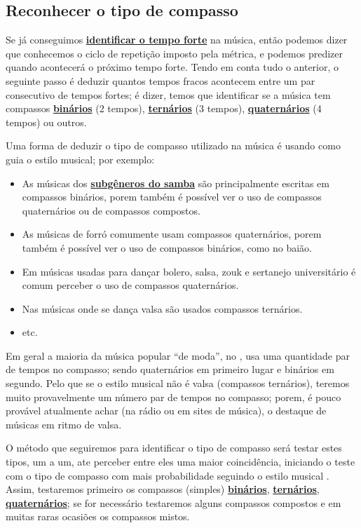 \subsection{Reconhecer o tipo de compasso}
\label{subsec:pertipodecompasso}
Se já conseguimos \hyperref[subsec:perceberTF1]{\textbf{identificar o tempo forte}} na música,
então podemos dizer que conhecemos o ciclo de repetição imposto pela métrica,
e podemos predizer quando acontecerá o próximo tempo forte.
Tendo em conta tudo o anterior,
o seguinte passo é deduzir quantos tempos fracos acontecem 
entre um par consecutivo de tempos fortes;
é dizer, 
temos que identificar se a música tem compassos 
\hyperref[subsec:compassobinario]{\textbf{binários}} (2 tempos), 
\hyperref[subsec:compassoternario]{\textbf{ternários}} (3 tempos), 
\hyperref[subsec:compassoquaternario]{\textbf{quaternários}} (4 tempos) 
ou outros. 

Uma forma de deduzir o tipo de compasso utilizado na música  é usando como guia o estilo musical; por exemplo:
\begin{itemize}
\item As músicas dos \hyperref[sec:FamiliaSamba]{\textbf{subgêneros do samba}} 
são principalmente escritas em compassos binários,
porem também é possível ver o uso de compassos quaternários ou de compassos compostos.
\item As músicas de forró comumente usam compassos quaternários,
porem também é possível ver o uso de compassos binários, como no baião. 
\item Em músicas usadas para dançar bolero, salsa, zouk 
e sertanejo universitário é comum perceber o uso de compassos quaternários.
\item Nas músicas onde se dança valsa são usados compassos ternários.
\item etc.
\end{itemize}
Em geral a maioria da música popular ``de moda'', no \AnoLivro, usa uma quantidade par de tempos no compasso;
sendo quaternários em primeiro lugar e binários em segundo.
Pelo que se o estilo musical não é valsa (compassos ternários), 
teremos muito provavelmente um número par de tempos no compasso;
porem, é  pouco provável atualmente achar (na rádio ou em sites de música),
o destaque de músicas em ritmo de valsa.

O método que seguiremos para identificar o tipo de compasso será testar estes tipos,
um a um, ate perceber entre eles uma maior coincidência,
iniciando o teste com o tipo de compasso com mais probabilidade seguindo o estilo musical \cite[pp. 10]{wright1992social}.
Assim, testaremos primeiro os compassos (simples)
\hyperref[subsec:compassobinario]{\textbf{binários}}, 
\hyperref[subsec:compassoternario]{\textbf{ternários}}, 
\hyperref[subsec:compassoquaternario]{\textbf{quaternários}};
se for necessário testaremos alguns compassos compostos 
e em muitas raras ocasiões os compassos mistos.

